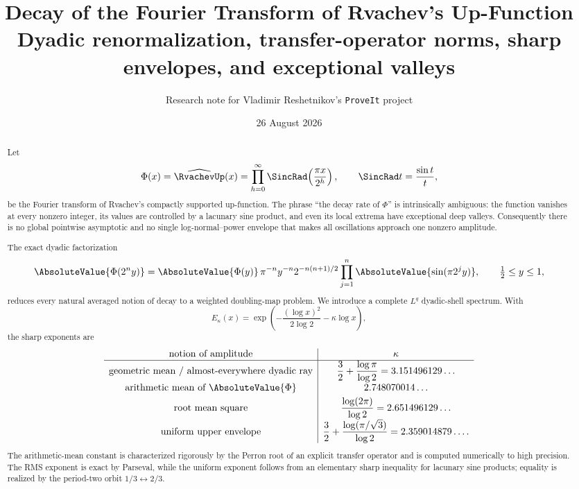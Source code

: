 \documentclass[11pt,oneside]{article}
\title{\bfseries Decay of the Fourier Transform of Rvachev's Up-Function\\[0.35em]
\large Dyadic renormalization, transfer-operator norms, sharp envelopes, and exceptional valleys}
\author{Research note for Vladimir Reshetnikov's \texttt{ProveIt} project}
\date{26 August 2026}
\theoremstyle{definition}
\theoremstyle{remark}
\newcommand{\Phiup}{\Phi}
\begin{document}
\maketitle

\begin{abstract}
Let
\[
 \Phiup(x)=\widehat{\RvachevUp}(x)
 =\prod_{h=0}^{\infty}\SincRad\!\left(\frac{\pi x}{2^h}\right),
 \qquad \SincRad t=\frac{\sin t}{t},
\]
be the Fourier transform of Rvachev's compactly supported up-function.  The phrase
``the decay rate of $\Phiup$'' is intrinsically ambiguous: the function vanishes at every
nonzero integer, its values are controlled by a lacunary sine product, and even its local
extrema have exceptional deep valleys.  Consequently there is no global pointwise
asymptotic and no single log-normal--power envelope that makes all oscillations approach
one nonzero amplitude.

The exact dyadic factorization
\[
 \AbsoluteValue{\Phiup(2^n y)}
 =\AbsoluteValue{\Phiup(y)}\,\pi^{-n}y^{-n}2^{-n(n+1)/2}
   \prod_{j=1}^{n}\AbsoluteValue{\sin(\pi 2^j y)},
 \qquad \tfrac12\le y\le1,
\]
reduces every natural averaged notion of decay to a weighted doubling-map problem.  We
introduce a complete $L^q$ dyadic-shell spectrum.  With
\[
 E_\kappa(x)=\exp\!\left(-\frac{(\log x)^2}{2\log2}-\kappa\log x\right),
\]
the sharp exponents are
\[
\begin{array}{c|c}
\text{notion of amplitude}&\kappa\\ \hline
\text{geometric mean / almost-everywhere dyadic ray}
 &\displaystyle \frac32+\frac{\log\pi}{\log2}=3.151496129\ldots\\[0.4em]
\text{arithmetic mean of }\AbsoluteValue{\Phiup}
 &\displaystyle 2.748070014\ldots\\[0.3em]
\text{root mean square}
 &\displaystyle \frac{\log(2\pi)}{\log2}=2.651496129\ldots\\[0.5em]
\text{uniform upper envelope}
 &\displaystyle \frac32+\frac{\log(\pi/\sqrt3)}{\log2}
   =2.359014879\ldots .
\end{array}
\]
The arithmetic-mean constant is characterized rigorously by the Perron root of an explicit
transfer operator and is computed numerically to high precision.  The RMS exponent is
exact by Parseval, while the uniform exponent follows from an elementary sharp inequality
for lacunary sine products; equality is realized by the period-two orbit
$1/3\leftrightarrow2/3$.


\end{abstract}
\end{document}
